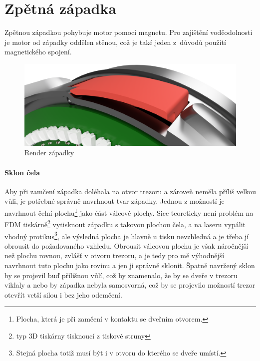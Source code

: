 \section{Zpětná západka}

Zpětnou západkou pohybuje motor pomocí magnetu. Pro zajištění vodě\-o\-dol\-nos\-ti je motor od západky oddělen stěnou, což je také jeden z~důvodů použití magne\-tic\-ké\-ho spojení.

\begin{figure}[h]
    \centering
    \includegraphics[width=\textwidth]{kapitoly/obrazky/E4/zapadka/render.png}
    \caption{Render západky}

    \label{fig:E4-zapadka}
\end{figure}

\paragraph{Sklon čela}

Aby při zamčení západka doléhala na otvor trezoru a zároveň neměla příliš velkou vůli, je potřebné správně navrhnout tvar západky.
Jednou z možností je navrhnout čelní plochu\footnote{Plocha, která je při zamčení v kontaktu se dveřním otvorem.} jako část válcové plochy. 
Sice teoreticky není problém na FDM tiskárně\footnote{typ 3D tiskárny tisknoucí z tiskové struny} vytisknout západku s takovou plochou čela,  %
a na laseru vypálit vhodný protikus\footnote{Stejná plocha totiž musí být i v otvoru do kterého se dveře umístí.},
ale výsledná plocha je hlavně u tisku nevzhledná a je třeba jí obrousit do požadovaného vzhledu. Obrousit válcovou plochu je však náročnější než plochu rovnou, zvlášť v otvoru trezoru, 
a je tedy pro mě výhodnější navrhnout tuto plochu jako rovinu a jen ji správně sklonit. Špatně navržený sklon by se projevil buď přílišnou vůlí, 
což by znamenalo, že by se dveře v trezoru viklaly a nebo by západka nebyla samosvorná, což by se projevilo možností trezor otevřít vetší silou 
i bez jeho odemčení.


